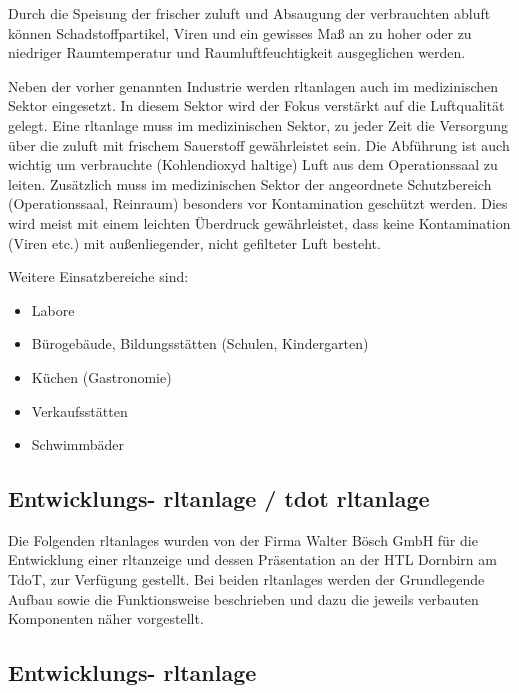 Durch die Speisung der frischer \gls{zuluft} und Absaugung der verbrauchten \gls{abluft} können Schadstoffpartikel, Viren und ein gewisses Maß an zu hoher oder zu niedriger Raumtemperatur und Raumluftfeuchtigkeit ausgeglichen werden. 
\cite[vgl.][]{DGWZ:o.J.}

Neben der vorher genannten Industrie werden \ac{rltanlage}n auch im medizinischen Sektor eingesetzt. In diesem Sektor wird der Fokus verstärkt auf die Luftqualität gelegt. Eine \ac{rltanlage} muss im medizinischen Sektor, zu jeder Zeit die Versorgung über die \gls{zuluft} mit frischem Sauerstoff gewährleistet sein. Die Abführung ist auch wichtig um verbrauchte (Kohlendioxyd haltige) Luft aus dem Operationssaal zu leiten. Zusätzlich muss im medizinischen Sektor der angeordnete Schutzbereich (\zB Operationssaal, Reinraum) besonders vor Kontamination geschützt werden. Dies wird meist mit einem leichten Überdruck gewährleistet, dass keine Kontamination (Viren etc.) mit außenliegender, nicht gefilteter Luft besteht.
\cite[vgl.][]{robatherm:2019,robatherm:o.J.}

Weitere Einsatzbereiche sind:
\begin{itemize}
	\item Labore
	\item Bürogebäude, Bildungsstätten (Schulen, Kindergarten)
	\item Küchen (Gastronomie)
	\item Verkaufsstätten
	\item Schwimmbäder
\end{itemize} 
\cite[vgl.][]{robatherm:2019,induux_wiki:2023}

\subsection{Entwicklungs- \ac{rltanlage} / \gls{tdot} \ac{rltanlage}}

Die Folgenden \acp{rltanlage} wurden von der Firma Walter Bösch GmbH für die Entwicklung einer \ac{rltanzeige} und dessen Präsentation an der HTL Dornbirn am TdoT, zur Verfügung gestellt. Bei beiden \acp{rltanlage} werden der Grundlegende Aufbau sowie die Funktionsweise beschrieben und dazu die jeweils verbauten Komponenten näher vorgestellt.

\subsection{Entwicklungs- \ac{rltanlage}} \label{entwicklungs_rlt}

